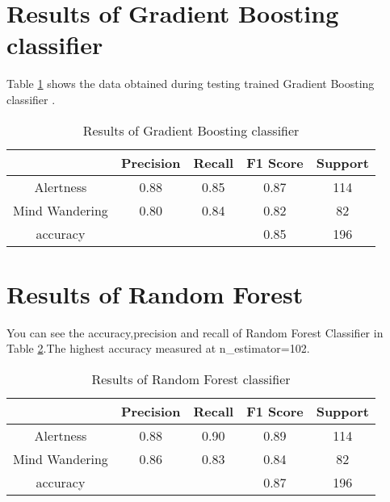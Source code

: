 \section{Results of Gradient Boosting classifier }
Table \ref{tab:Gradient_Boosting_classifier_res} shows the data obtained during testing trained Gradient Boosting classifier .
\begin{table}[ht]
    \centering
    \caption{Results of Gradient Boosting classifier }
    {\renewcommand{\arraystretch}{1.2}
    \begin{tabular}{ccccc}
       \hline
       \hline
         & Precision & Recall & F1 Score & Support \\
        \hline
        
         Alertness      & 0.88     & 0.85     & 0.87       &114 \\
         Mind Wandering      & 0.80     & 0.84     & 0.82        &82 \\
    accuracy      &         &           & 0.85       &196 \\
          \hline
          \hline
    \end{tabular}
    }
    \label{tab:Gradient_Boosting_classifier_res}
\end{table}

\section{Results of Random Forest }
You can see the accuracy,precision and recall of Random Forest Classifier in Table \ref{tab:rf_res}.The highest accuracy measured at n\_estimator=102. 
\begin{table}[ht]
    \centering
    \caption{Results of Random Forest classifier }
    {\renewcommand{\arraystretch}{1.2}
    \begin{tabular}{ccccc}
       \hline
       \hline
         & Precision & Recall & F1 Score & Support \\
        \hline
          Alertness &      0.88     & 0.90  &    0.89      & 114 \\
         Mind Wandering    &   0.86     & 0.83     & 0.84       & 82 \\
    accuracy    &           &           & 0.87      & 196 \\
          \hline
          \hline
    \end{tabular}
    }
    \label{tab:rf_res}
\end{table}

